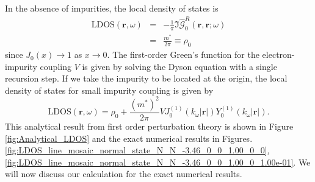 In the absence of impurities, the local density of states is
\begin{eqnarray}
\text{LDOS}(\mathbf{r}, \omega) &=&
 -\frac{1}{\pi} \mathfrak{I}
\hat{\mathcal{G}}^R_0\left(\mathbf{r}, \mathbf{r}; \omega \right)\\
&=& \frac{m^*}{2\pi} \equiv \rho_0
\label{eq:LDOS_zeroth}
\end{eqnarray}
since $J_0(x)\rightarrow1$ as $x\rightarrow0$. 
The first-order Green's function for the electron-impurity coupling $V$ is given by solving the Dyson equation with a single recursion step. If we take the impurity to be located at the origin, the local density of states for small impurity coupling is given by
\begin{equation}
\text{LDOS}(\mathbf{r}, \omega) = \rho_0 + \frac{(m^*)^2}{2\pi} V J_0^{(1)}\left(k_\omega|\mathbf{r}|\right) Y_0^{(1)}\left(k_\omega|\mathbf{r}|\right).
\label{eq:LDOS_first}
\end{equation}
This analytical result from first order perturbation theory is shown in Figure \ref{fig:Analytical_LDOS} and the exact numerical results in Figures. \ref{fig:LDOS_line_mosaic_normal_state_N_N_-3.46_0_0_1.00_0_0}, \ref{fig:LDOS_line_mosaic_normal_state_N_N_-3.46_0_0_1.00_0_1.00e-01}. We will now discuss our calculation for the exact numerical results.

